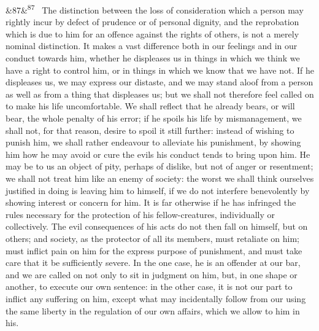 \documentclass[12pt]{article}
\newcommand{\para}[1][]{\par\noindent\ifx&#1&\else\textsuperscript{\footnotesize #1}~\fi}
\begin{document}
\para[87] The distinction between the loss of consideration which a person may rightly incur by defect of prudence or of personal dignity, and the reprobation which is due to him for an offence against the rights of others, is not a merely nominal distinction. It makes a vast difference both in our feelings and in our conduct towards him, whether he displeases us in things in which we think we have a right to control him, or in things in which we know that we have not. If he displeases us, we may express our distaste, and we may stand aloof from a person as well as from a thing that displeases us; but we shall not therefore feel called on to make his life uncomfortable. We shall reflect that he already bears, or will bear, the whole penalty of his error; if he spoils his life by mismanagement, we shall not, for that reason, desire to spoil it still further: instead of wishing to punish him, we shall rather endeavour to alleviate his punishment, by showing him how he may avoid or cure the evils his conduct tends to bring upon him. He may be to us an object of pity, perhaps of dislike, but not of anger or resentment; we shall not treat him like an enemy of society: the worst we shall think ourselves justified in doing is leaving him to himself, if we do not interfere benevolently by showing interest or concern for him. It is far otherwise if he has infringed the rules necessary for the protection of his fellow-creatures, individually or collectively. The evil consequences of his acts do not then fall on himself, but on others; and society, as the protector of all its members, must retaliate on him; must inflict pain on him for the express purpose of punishment, and must take care that it be sufficiently severe. In the one case, he is an offender at our bar, and we are called on not only to sit in judgment on him, but, in one shape or another, to execute our own sentence: in the other case, it is not our part to inflict any suffering on him, except what may incidentally follow from our using the same liberty in the regulation of our own affairs, which we allow to him in his.
\end{document}
